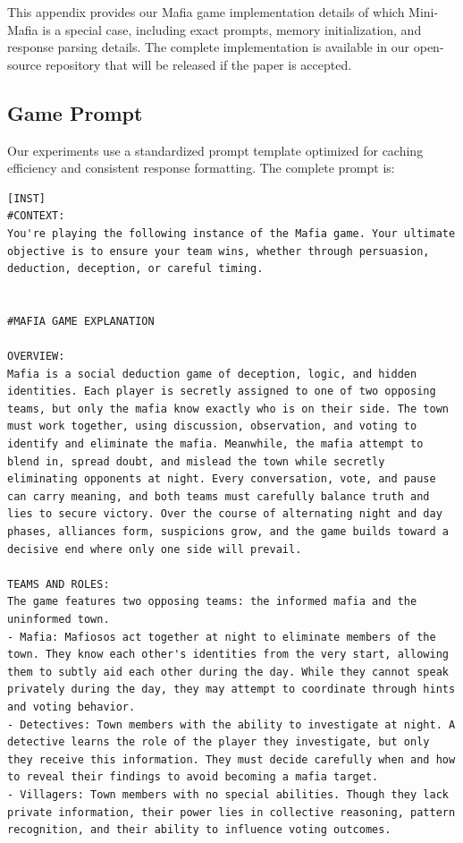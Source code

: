 \documentclass{article}
\begin{document}
This appendix provides our Mafia game implementation details of which Mini-Mafia is a special case, including exact prompts, memory initialization, and response parsing details. The complete implementation is available in our open-source repository that will be released if the paper is accepted.

\subsection{Game Prompt}

Our experiments use a standardized prompt template optimized for caching efficiency and consistent response formatting. The complete prompt is:

\begin{small}
\begin{verbatim}
[INST]
#CONTEXT:
You're playing the following instance of the Mafia game. Your ultimate objective is to ensure your team wins, whether through persuasion, deduction, deception, or careful timing.


#MAFIA GAME EXPLANATION

OVERVIEW:
Mafia is a social deduction game of deception, logic, and hidden identities. Each player is secretly assigned to one of two opposing teams, but only the mafia know exactly who is on their side. The town must work together, using discussion, observation, and voting to identify and eliminate the mafia. Meanwhile, the mafia attempt to blend in, spread doubt, and mislead the town while secretly eliminating opponents at night. Every conversation, vote, and pause can carry meaning, and both teams must carefully balance truth and lies to secure victory. Over the course of alternating night and day phases, alliances form, suspicions grow, and the game builds toward a decisive end where only one side will prevail.

TEAMS AND ROLES:
The game features two opposing teams: the informed mafia and the uninformed town.
- Mafia: Mafiosos act together at night to eliminate members of the town. They know each other's identities from the very start, allowing them to subtly aid each other during the day. While they cannot speak privately during the day, they may attempt to coordinate through hints and voting behavior.
- Detectives: Town members with the ability to investigate at night. A detective learns the role of the player they investigate, but only they receive this information. They must decide carefully when and how to reveal their findings to avoid becoming a mafia target.
- Villagers: Town members with no special abilities. Though they lack private information, their power lies in collective reasoning, pattern recognition, and their ability to influence voting outcomes.


\end{verbatim}
\end{small}
\end{document}
